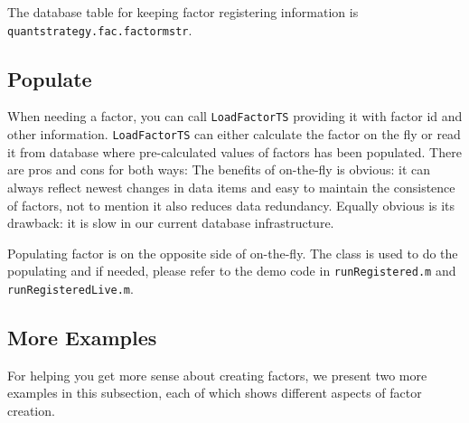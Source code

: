 The database table for keeping factor registering information is
\texttt{quantstrategy\allowbreak{}.fac\allowbreak{}.factormstr}.
	
\subsection{Populate\label{sec:Populate}}

When needing a factor, you can call \texttt{LoadFactorTS} providing it with factor id and other information.
\texttt{LoadFactorTS} can either calculate the factor on the fly or
read it from database where pre-calculated values of factors
has been populated.
There are pros and cons for both ways:
The benefits of on-the-fly is obvious: 
it can always reflect newest changes in data items and easy to maintain the consistence of factors,
not to mention it also reduces data redundancy.
Equally obvious is its drawback: it is slow in our current database infrastructure.

Populating factor is on the opposite side of on-the-fly.
The class  is used to do the populating and
if needed, please refer to the demo code in
\texttt{run\allowbreak{}Registered.m} and \texttt{run\allowbreak{}Registered\allowbreak{}Live.m}.

\subsection{More Examples}

For helping you get more sense about creating factors,
we present two more examples in this subsection,
each of which shows different aspects of factor creation.

